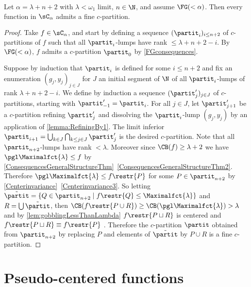 \begin{proposition}\label{ExistenceFinePartitions}
Let $\alpha=\lambda+n+2$ with $\lambda<\omega_1$ limit, $n\in\N$, and assume $\FG(<\alpha)$.
Then every function in $\sC_\alpha$ admits a fine $c$-partition.
\end{proposition}
\begin{proof}
Take $f\in \sC_\alpha$, and start by defining a sequence $(\partit_i)_{i\leq n+2}$ of $c$-partitions of $f$ such that all $\partit_i$-lumps have rank $\leq\lambda+n+2-i$.
By $\FG(<\alpha)$, $f$ admits a  $c$-partition $\partit_0$ by \cref{FGconsequences}.

Suppose by induction that $\partit_i$ is defined for some $i\leq n+2$ and fix an enumeration $(g_j,y_j)_{j\in J}$ for $J$ an initial segment of $\N$ of all $\partit_i$-lumps of rank $\lambda+n+2-i$.
We define by induction a sequence $(\partit'_j)_{j\in J}$ of $c$-partitions, starting with $\partit'_{-1}=\partit_i$. For all $j\in J$, let $\partit'_{j+1}$ be a $c$-partition refining $\partit'_{j}$ and dissolving the $\partit_i$-lump $(g_j,y_j)$ by an application of \cref{lemma:RefiningBy1}.
The limit inferior $\partit_{i+1}=\bigcup_{k\in J} \bigcap_{k\leq j \in J} \partit'_j$ is the desired $c$-partition.
Note that all $\partit_{n+2}$-lumps have rank $<\lambda$. Moreover since $\CB(f)\geq \lambda+2$ we have $\pgl \Maximalfct{\lambda}\leq f$ by \cref{ConsequencesGeneralStructureThm}~\cref{ConsequencesGeneralStructureThm2}. Therefore $\pgl \Maximalfct{\lambda}\leq f\restr{P}$ for some $P\in \partit_{n+2}$ by \cref{Centerinvariance}~\ref{Centerinvariance3}.
So letting $\tilde{\partit}=\{Q\in \partit_{n+2} \mid f\restr{Q}\leq \Maximalfct{\lambda}\}$ and $R=\bigcup \tilde{\partit}$,
then $\CB(f\restr{P\cup R})\geq \CB(\pgl \Maximalfct{\lambda})>\lambda$ and by \cref{lem:gobblingLessThanLambda}
$f\restr{P\sqcup R}$ is centered and $f\restr{P\sqcup R}\equiv f\restr{P}$ .
Therefore the $c$-partition $\partit$ obtained from $\partit_{n+2}$ by replacing $P$ and elements of $\tilde{\partit}$ by $P\cup R$ is a fine $c$-partition.
\end{proof}



\section{Pseudo-centered functions}\label{subsec:pseudocentered}

